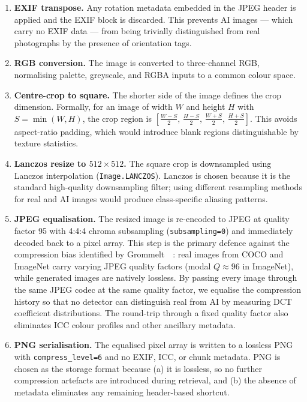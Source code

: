 \begin{enumerate}

\item \textbf{EXIF transpose.}
Any rotation metadata embedded in the JPEG header is applied and the
EXIF block is discarded.
This prevents AI images — which carry no EXIF data — from being
trivially distinguished from real photographs by the presence of
orientation tags.

\item \textbf{RGB conversion.}
The image is converted to three-channel RGB, normalising palette,
greyscale, and RGBA inputs to a common colour space.

\item \textbf{Centre-crop to square.}
The shorter side of the image defines the crop dimension.
Formally, for an image of width $W$ and height $H$ with
$S = \min(W, H)$, the crop region is
$\left[\frac{W-S}{2},\, \frac{H-S}{2},\,
 \frac{W+S}{2},\, \frac{H+S}{2}\right]$.
This avoids aspect-ratio padding, which would introduce blank regions
distinguishable by texture statistics.

\item \textbf{Lanczos resize to $512 \times 512$.}
The square crop is downsampled using Lanczos interpolation
(\texttt{Image.LANCZOS}).
Lanczos is chosen because it is the standard high-quality downsampling
filter; using different resampling methods for real and AI images would
produce class-specific aliasing patterns.

\item \textbf{JPEG equalisation.}
The resized image is re-encoded to JPEG at quality factor 95
with 4:4:4 chroma subsampling (\texttt{subsampling=0}) and
immediately decoded back to a pixel array.
This step is the primary defence against the compression bias
identified by Grommelt~\etal~\cite{grommelt2024jpeg}: real images
from COCO and ImageNet carry varying JPEG quality factors (modal
$Q \approx 96$ in ImageNet), while generated images are natively
lossless.
By passing every image through the same JPEG codec at the same quality
factor, we equalise the compression history so that no detector can
distinguish real from AI by measuring DCT coefficient distributions.
The round-trip through a fixed quality factor also eliminates
ICC colour profiles and other ancillary metadata.

\item \textbf{PNG serialisation.}
The equalised pixel array is written to a lossless PNG with
\texttt{compress\_level=6} and no EXIF, ICC, or chunk metadata.
PNG is chosen as the storage format because (a) it is lossless, so
no further compression artefacts are introduced during retrieval, and
(b) the absence of metadata eliminates any remaining header-based
shortcut.

\end{enumerate}


